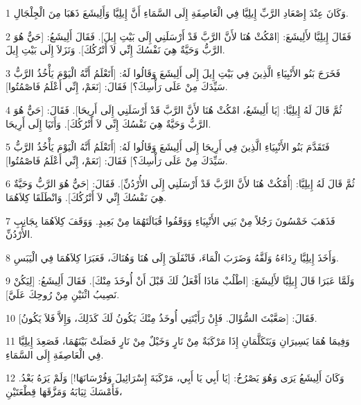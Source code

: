 \par 1 وَكَانَ عِنْدَ إِصْعَادِ الرَّبِّ إِيلِيَّا فِي الْعَاصِفَةِ إِلَى السَّمَاءِ أَنَّ إِيلِيَّا وَأَلِيشَعَ ذَهَبَا مِنَ الْجِلْجَالِ.
\par 2 فَقَالَ إِيلِيَّا لأَلِيشَعَ: [امْكُثْ هُنَا لأَنَّ الرَّبَّ قَدْ أَرْسَلَنِي إِلَى بَيْتِ إِيلَ]. فَقَالَ أَلِيشَعُ: [حَيٌّ هُوَ الرَّبُّ وَحَيَّةٌ هِيَ نَفْسُكَ إِنِّي لاَ أَتْرُكُكَ]. وَنَزَلاَ إِلَى بَيْتِ إِيلَ.
\par 3 فَخَرَجَ بَنُو الأَنْبِيَاءِ الَّذِينَ فِي بَيْتِ إِيلَ إِلَى أَلِيشَعَ وَقَالُوا لَهُ: [أَتَعْلَمُ أَنَّهُ الْيَوْمَ يَأْخُذُ الرَّبُّ سَيِّدَكَ مِنْ عَلَى رَأْسِكَ؟] فَقَالَ: [نَعَمْ، إِنِّي أَعْلَمُ فَاصْمُتُوا].
\par 4 ثُمَّ قَالَ لَهُ إِيلِيَّا: [يَا أَلِيشَعُ، امْكُثْ هُنَا لأَنَّ الرَّبَّ قَدْ أَرْسَلَنِي إِلَى أَرِيحَا]. فَقَالَ: [حَيٌّ هُوَ الرَّبُّ وَحَيَّةٌ هِيَ نَفْسُكَ إِنِّي لاَ أَتْرُكُكَ]. وَأَتَيَا إِلَى أَرِيحَا.
\par 5 فَتَقَدَّمَ بَنُو الأَنْبِيَاءِ الَّذِينَ فِي أَرِيحَا إِلَى أَلِيشَعَ وَقَالُوا لَهُ: [أَتَعْلَمُ أَنَّهُ الْيَوْمَ يَأْخُذُ الرَّبُّ سَيِّدَكَ مِنْ عَلَى رَأْسِكَ؟] فَقَالَ: [نَعَمْ، إِنِّي أَعْلَمُ فَاصْمُتُوا].
\par 6 ثُمَّ قَالَ لَهُ إِيلِيَّا: [أُمْكُثْ هُنَا لأَنَّ الرَّبَّ قَدْ أَرْسَلَنِي إِلَى الأُرْدُنِّ]. فَقَالَ: [حَيٌّ هُوَ الرَّبُّ وَحَيَّةٌ هِيَ نَفْسُكَ إِنِّي لاَ أَتْرُكُكَ]. وَانْطَلَقَا كِلاَهُمَا.
\par 7 فَذَهَبَ خَمْسُونَ رَجُلاً مِنْ بَنِي الأَنْبِيَاءِ وَوَقَفُوا قُبَالَتَهُمَا مِنْ بَعِيدٍ. وَوَقَفَ كِلاَهُمَا بِجَانِبِ الأُرْدُنِّ.
\par 8 وَأَخَذَ إِيلِيَّا رِدَاءَهُ وَلَفَّهُ وَضَرَبَ الْمَاءَ، فَانْفَلَقَ إِلَى هُنَا وَهُنَاكَ، فَعَبَرَا كِلاَهُمَا فِي الْيَبَسِ.
\par 9 وَلَمَّا عَبَرَا قَالَ إِيلِيَّا لأَلِيشَعَ: [اطْلُبْ مَاذَا أَفْعَلُ لَكَ قَبْلَ أَنْ أُوخَذَ مِنْكَ]. فَقَالَ أَلِيشَعُ: [لِيَكُنْ نَصِيبُ اثْنَيْنِ مِنْ رُوحِكَ عَلَيَّ].
\par 10 فَقَالَ: [صَعَّبْتَ السُّؤَالَ. فَإِنْ رَأَيْتَنِي أُوخَذُ مِنْكَ يَكُونُ لَكَ كَذَلِكَ، وَإِلاَّ فَلاَ يَكُونُ].
\par 11 وَفِيمَا هُمَا يَسِيرَانِ وَيَتَكَلَّمَانِ إِذَا مَرْكَبَةٌ مِنْ نَارٍ وَخَيْلٌ مِنْ نَارٍ فَصَلَتْ بَيْنَهُمَا، فَصَعِدَ إِيلِيَّا فِي الْعَاصِفَةِ إِلَى السَّمَاءِ.
\par 12 وَكَانَ أَلِيشَعُ يَرَى وَهُوَ يَصْرُخُ: [يَا أَبِي يَا أَبِي، مَرْكَبَةَ إِسْرَائِيلَ وَفُرْسَانَهَا!] وَلَمْ يَرَهُ بَعْدُ. فَأَمْسَكَ ثِيَابَهُ وَمَزَّقَهَا قِطْعَتَيْنِ،
